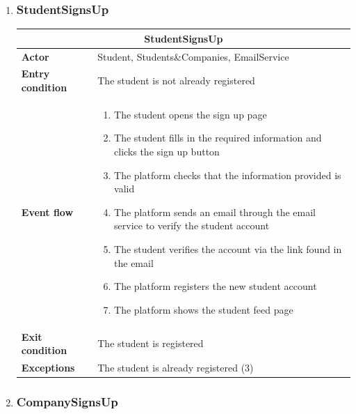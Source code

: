 \begin{enumerate}[label=\textbf{UC\arabic* -}]

\item \subsubsection{StudentSignsUp}

\begin{table}[H]
    \centering
    \begin{tabular}{|l|m{10cm}|}
        \hline \multicolumn{2}{|c|}{\textbf{StudentSignsUp}} \\
        \hline \textbf{Actor} & Student, Students\&Companies, EmailService \\
        \hline \textbf{Entry condition} & The student is not already registered \\
        \hline \textbf{Event flow} &
            \begin{enumerate}[label=\arabic*]
                \item The student opens the sign up page
                \item The student fills in the required information and clicks the sign up button
                \item The platform checks that the information provided is valid
                \item The platform sends an email through the email service to verify the student account
                \item The student verifies the account via the link found in the email
                \item The platform registers the new student account
                \item The platform shows the student feed page
            \end{enumerate} \\
        \hline \textbf{Exit condition} & The student is registered \\
        \hline \textbf{Exceptions} & The student is already registered (3) \\
        \hline
    \end{tabular}
\end{table}

\item \subsubsection{CompanySignsUp}


\end{enumerate}
